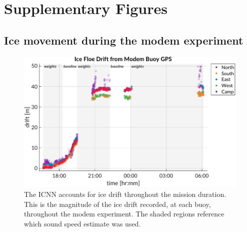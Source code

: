 \clearpage
\section*{Supplementary Figures}

\subsection*{Ice movement during the modem experiment}
\begin{figure}[h!]
\includegraphics[width=\textwidth]{figs/Fig9.pdf}
\caption{\label{fig:iceFloeDrift}{The ICNN accounts for ice drift throughout the mission duration. This is the magnitude of the ice drift recorded, at each buoy, throughout the modem experiment. The shaded regions reference which sound speed estimate was used.}}
\end{figure}

\clearpage
\FloatBarrier
